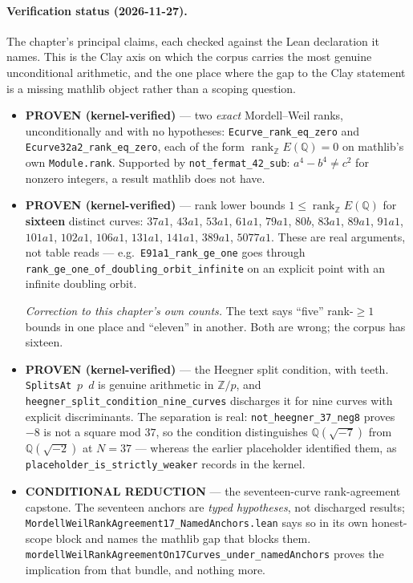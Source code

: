 \paragraph{Verification status (2026-11-27).}
The chapter's principal claims, each checked against the Lean declaration it
names. This is the Clay axis on which the corpus carries the most genuine
unconditional arithmetic, and the one place where the gap to the Clay statement
is a missing mathlib object rather than a scoping question.
\begin{itemize}

\item \textbf{PROVEN (kernel-verified)} --- two \emph{exact} Mordell--Weil
ranks, unconditionally and with no hypotheses:
\texttt{Ecurve\_rank\_eq\_zero} and \texttt{Ecurve32a2\_rank\_eq\_zero}, each
of the form $\operatorname{rank}_{\mathbb{Z}} E(\mathbb{Q}) = 0$ on mathlib's
own \texttt{Module.rank}. Supported by
\texttt{not\_fermat\_42\_sub}: $a^4 - b^4 \neq c^2$ for nonzero integers, a
result mathlib does not have.

\item \textbf{PROVEN (kernel-verified)} --- rank lower bounds
$1 \le \operatorname{rank}_{\mathbb{Z}} E(\mathbb{Q})$ for \textbf{sixteen}
distinct curves: $37a1$, $43a1$, $53a1$, $61a1$, $79a1$, $80b$, $83a1$, $89a1$,
$91a1$, $101a1$, $102a1$, $106a1$, $131a1$, $141a1$, $389a1$, $5077a1$. These
are real arguments, not table reads --- e.g.\ \texttt{E91a1\_rank\_ge\_one}
goes through \texttt{rank\_ge\_one\_of\_doubling\_orbit\_infinite} on an
explicit point with an infinite doubling orbit.

\emph{Correction to this chapter's own counts.} The text says ``five''
rank-$\ge 1$ bounds in one place and ``eleven'' in another. Both are wrong; the
corpus has sixteen.

\item \textbf{PROVEN (kernel-verified)} --- the Heegner split condition, with
teeth. \texttt{SplitsAt}~$p$~$d$ is genuine arithmetic in $\mathbb{Z}/p$, and
\texttt{heegner\_split\_condition\_nine\_curves} discharges it for nine curves
with explicit discriminants. The separation is real:
\texttt{not\_heegner\_37\_neg8} proves $-8$ is not a square mod $37$, so the
condition distinguishes $\mathbb{Q}(\sqrt{-7})$ from $\mathbb{Q}(\sqrt{-2})$ at
$N = 37$ --- whereas the earlier placeholder identified them, as
\texttt{placeholder\_is\_strictly\_weaker} records in the kernel.

\item \textbf{CONDITIONAL REDUCTION} --- the seventeen-curve rank-agreement
capstone. The seventeen anchors are \emph{typed hypotheses}, not discharged
results; \texttt{MordellWeilRank\-Agreement17\_NamedAnchors.lean} says so in
its own honest-scope block and names the mathlib gap that blocks them.
\texttt{mordellWeilRankAgreementOn17Curves\_under\_namedAnchors} proves the
implication from that bundle, and nothing more.


\end{itemize}
